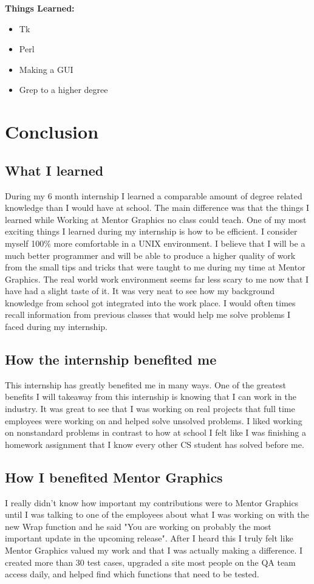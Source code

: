 \documentclass[letterpaper,10pt,notitlepage,fleqn]{article}
\begin{document}
\textbf{Things Learned:}
\begin{itemize} 
        \item Tk
        \item Perl
        \item Making a GUI
        \item Grep to a higher degree
    \end{itemize}

\section{Conclusion}
\subsection{What I learned}
\indent During my 6 month internship I learned a comparable amount of degree related knowledge
than I would have at school. The main difference was that the things I learned while 
Working at Mentor Graphics no class could teach. One of my most exciting things 
I learned during my internship is how to be efficient. I consider myself 100\% more 
comfortable in a UNIX environment. I believe that I will be a much better programmer 
and will be able to produce a higher quality of work from the small tips and tricks 
that were taught to me during my time at Mentor Graphics. The real world work environment seems 
far less scary to me now that I have had a slight taste of it. It was very neat 
to see how my background knowledge from school got integrated into the work place.
I would often times recall information from previous classes that would help me 
solve problems I faced during my internship. 
\\
\subsection{How the internship benefited me}
\indent This internship has greatly benefited me in many ways. One of the greatest 
benefits I will takeaway from this internship is knowing that I can work in the 
industry. It was great to see that I was working on real projects that full time 
employees were working on and helped solve unsolved problems. I liked working on 
nonstandard problems in contrast to how at school I felt like I was finishing 
a homework assignment that I know every other CS student has solved before me. 
\\
\subsection{How I benefited Mentor Graphics}
\indent I really didn't know how important my contributions were to Mentor Graphics until 
I was talking to  one of the employees about what I was working on with the new Wrap function and he said "You 
are working on probably the most important update in the upcoming release". After 
I heard this I truly felt like Mentor Graphics valued my work and that I was actually
making a difference. I created more than 30 test cases, upgraded a site most people 
on the QA team access daily, and helped find which functions that need to be tested.\\ 
\end{document}
